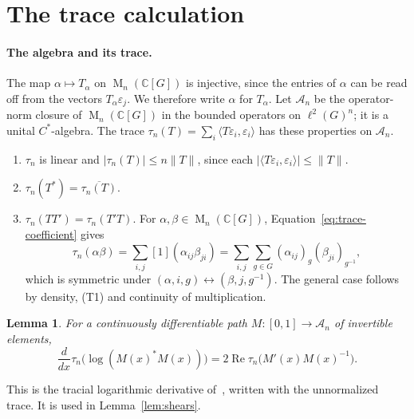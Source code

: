 \documentclass[11pt]{article}
\newtheorem{lemma}[theorem]{Lemma}
\theoremstyle{remark}
\numberwithin{equation}{section}
\newcommand{\C}{\mathbb C}
\newcommand{\Mat}{\operatorname{M}}
\begin{document}
\section{The trace calculation}
\label{sec:analysis}

\paragraph{The algebra and its trace.}
The map $\alpha\mapsto T_\alpha$ on $\Mat_n(\C[G])$ is injective, since the entries of $\alpha$ can be read off from the vectors $T_\alpha\varepsilon_j$. We therefore write $\alpha$ for $T_\alpha$. Let $\mathcal A_n$ be the operator-norm closure of $\Mat_n(\C[G])$ in the bounded operators on $\ell^2(G)^n$; it is a unital $C^*$-algebra. The trace $\tau_n(T)=\sum_i\langle T\varepsilon_i,\varepsilon_i\rangle$ has these properties on $\mathcal A_n$.
\begin{enumerate}[label=(T\arabic*),leftmargin=3em]
\item $\tau_n$ is linear and $|\tau_n(T)|\le n\|T\|$, since each $|\langle T\varepsilon_i,\varepsilon_i\rangle|\le\|T\|$.
\item $\tau_n(T^*)=\overline{\tau_n(T)}$.
\item $\tau_n(TT')=\tau_n(T'T)$. For $\alpha,\beta\in\Mat_n(\C[G])$, Equation~\eqref{eq:trace-coefficient} gives
\[
 \tau_n(\alpha\beta)=\sum_{i,j}[1](\alpha_{ij}\beta_{ji})
 =\sum_{i,j}\sum_{g\in G}(\alpha_{ij})_g(\beta_{ji})_{g^{-1}},
\]
which is symmetric under $(\alpha,i,g)\leftrightarrow(\beta,j,g^{-1})$. The general case follows by density, (T1) and continuity of multiplication.
\end{enumerate}

\begin{lemma}\label{lem:logderivative}
For a continuously differentiable path
$M:[0,1]\to\mathcal A_n$ of invertible elements,
\[
 \frac{d}{dx}\tau_n\bigl(\log(M(x)^*M(x))\bigr)
 =2\operatorname{Re}\tau_n\bigl(M'(x)M(x)^{-1}\bigr).
\]
\end{lemma}

This is the tracial logarithmic derivative of~\cite[Lemma 2]{FK1952}, written with the unnormalized trace. It is used in Lemma~\ref{lem:shears}.
\end{document}
